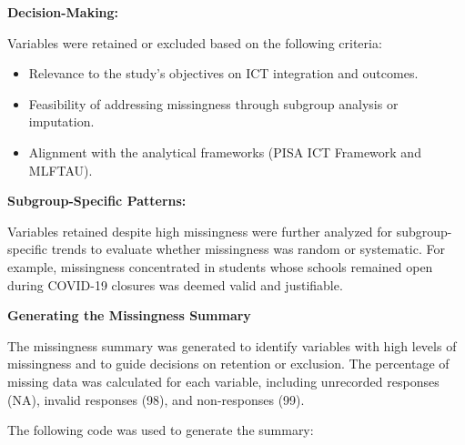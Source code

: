 \documentclass[
]{article}
\begin{document}
\textbf{Decision-Making:}

Variables were retained or excluded based on the following criteria:

\begin{itemize}
\item
  Relevance to the study's objectives on ICT integration and outcomes.
\item
  Feasibility of addressing missingness through subgroup analysis or
  imputation.
\item
  Alignment with the analytical frameworks (PISA ICT Framework and
  MLFTAU).
\end{itemize}

\textbf{Subgroup-Specific Patterns:}

Variables retained despite high missingness were further analyzed for
subgroup-specific trends to evaluate whether missingness was random or
systematic. For example, missingness concentrated in students whose
schools remained open during COVID-19 closures was deemed valid and
justifiable.

\textbf{Generating the Missingness Summary}

The missingness summary was generated to identify variables with high
levels of missingness and to guide decisions on retention or exclusion.
The percentage of missing data was calculated for each variable,
including unrecorded responses (NA), invalid responses (98), and
non-responses (99).

The following code was used to generate the summary:
\end{document}

